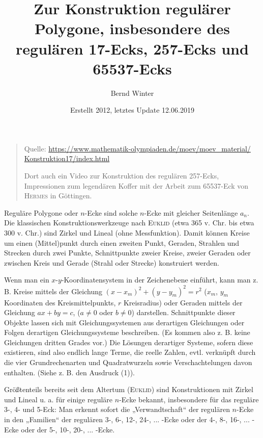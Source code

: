\documentclass[11pt]{article}
\author{Bernd Winter}
\title{Zur Konstruktion regulärer Polygone, insbesondere des regulären
  17-Ecks, 257-Ecks und 65537-Ecks}
\date{Erstellt 2012, letztes Update 12.06.2019}
\newcommand{\br}[1]{\ensuremath{\left(#1\right)}}
\begin{document}
 
\maketitle         
\begin{quote}
  Quelle: \url{https://www.mathematik-olympiaden.de/moev/moev_material/}\\
  \url{Konstruktion17/index.html}

  Dort auch ein Video zur Konstruktion des regulären 257-Ecks, Impressionen
  zum legendären Koffer mit der Arbeit zum 65537-Eck von \textsc{Hermes} in
  Göttingen.
\end{quote}
Reguläre Polygone oder $n$-Ecke sind solche $n$-Ecke mit gleicher Seitenlänge
$a_n$.  Die klassischen Konstruktionswerkzeuge nach \textsc{Euklid} (etwa 365
v. Chr. bis etwa 300 v. Chr.) sind Zirkel und Lineal (ohne Messfunktion).
Damit können Kreise um einen (Mittel)punkt durch einen zweiten Punkt, Geraden,
Strahlen und Strecken durch zwei Punkte, Schnittpunkte zweier Kreise, zweier
Geraden oder zwischen Kreis und Gerade (Strahl oder Strecke) konstruiert
werden.

Wenn man ein $x$-$y$-Koordinatensystem in der Zeichenebene einführt, kann man
z. B. Kreise mittels der Gleichung $\br{x-x_m}^2+\br{y-y_m}^2=r^2$ ($x_m$,
$y_m$ Koordinaten des Kreismittelpunkts, $r$ Kreisradius) oder Geraden mittels
der Gleichung $ax + by = c$, ($a \neq 0$ oder $b \neq 0$) darstellen.
Schnittpunkte dieser Objekte lassen sich mit Gleichungssystemen aus derartigen
Gleichungen oder Folgen derartigen Gleichungssysteme beschreiben. (Es kommen
also z. B. keine Gleichungen dritten Grades vor.) Die Lösungen derartiger
Systeme, sofern diese existieren, sind also endlich lange Terme, die reelle
Zahlen, evtl. verknüpft durch die vier Grundrechenarten und Quadratwurzeln
sowie Verschachtelungen davon enthalten. (Siehe z. B. den Ausdruck (1)).

Größtenteils bereits seit dem Altertum (\textsc{Euklid}) sind Konstruktionen
mit Zirkel und Lineal u. a. für einige reguläre $n$-Ecke bekannt, insbesondere
für das reguläre 3-, 4- und 5-Eck: Man erkennt sofort die „Verwandtschaft“ der
regulären $n$-Ecke in den „Familien“ der regulären 3-, 6-, 12-, 24-, ... -Ecke
oder der 4-, 8-, 16-, ... -Ecke oder der 5-, 10-, 20-, ... -Ecke.
\end{document}
